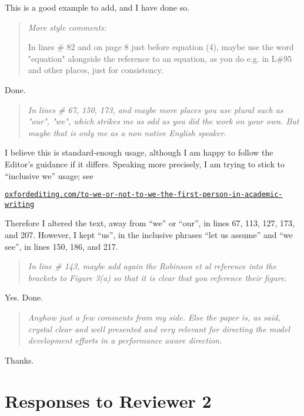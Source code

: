 \documentclass[letterpaper,final,12pt,reqno]{amsart}
\newenvironment{review}%
{\bigskip \par \begin{quote} \selectfont \sl}%
{\end{quote}}
\begin{document}
\noindent This is a good example to add, and I have done so.

\begin{review}
More style comments:

In lines \# 82 and on page 8 just before equation (4), maybe use the word "equation" alongside the reference to an equation, as you do e.g. in L\#95 and other places, just for consistency.
\end{review}

\noindent Done.

\begin{review}
In lines \# 67, 150, 173, and maybe more places you use plural such as "our", "we", which strikes me as odd as you did the work on your own. But maybe that is only me as a non native English speaker.
\end{review}

\noindent I believe this is standard-enough usage, although I am happy to follow the Editor's guidance if it differs.  Speaking more precisely, I am trying to stick to ``inclusive we'' usage; see

\medskip
{\footnotesize \href{https://oxfordediting.com/to-we-or-not-to-we-the-first-person-in-academic-writing/}{\texttt{oxfordediting.com/to-we-or-not-to-we-the-first-person-in-academic-writing}}}

\medskip
\noindent Therefore I altered the text, away from ``we'' or ``our'', in lines 67, 113, 127, 173, and 207.  However, I kept ``us'', in the inclusive phrases ``let us assume'' and ``we see'', in lines 150, 186, and 217.

\begin{review}
In line \# 143, maybe add again the Robinson et al reference into the brackets to Figure 3(a) so that it is clear that you reference their figure.
\end{review}

\noindent Yes.  Done.

\begin{review}
Anyhow just a few comments from my side. Else the paper is, as said, crystal clear and well presented and very relevant for directing the model development efforts in a performance aware direction.
\end{review}

\noindent Thanks.


\section{Responses to Reviewer 2}
\end{document}
